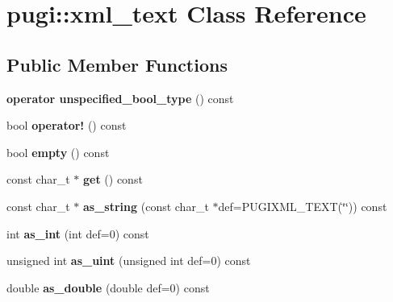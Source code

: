 \hypertarget{classpugi_1_1xml__text}{}\section{pugi\+:\+:xml\+\_\+text Class Reference}
\label{classpugi_1_1xml__text}
\subsection*{Public Member Functions}
\begin{DoxyCompactItemize}
\item 
\mbox{\label{classpugi_1_1xml__text_a86173c40769addc6341cfa20036cf3a3}} 
{\bfseries operator unspecified\+\_\+bool\+\_\+type} () const
\item 
\mbox{\label{classpugi_1_1xml__text_a150343a64b87a3588aa6536f99c163a3}} 
bool {\bfseries operator!} () const
\item 
\mbox{\label{classpugi_1_1xml__text_a85208781a283c74ee85ea614d840fad1}} 
bool {\bfseries empty} () const
\item 
\mbox{\label{classpugi_1_1xml__text_af0d58e0fcba861989b74083675b828c3}} 
const char\+\_\+t $\ast$ {\bfseries get} () const
\item 
\mbox{\label{classpugi_1_1xml__text_a0326a8addff72d18208b259f71e64af0}} 
const char\+\_\+t $\ast$ {\bfseries as\+\_\+string} (const char\+\_\+t $\ast$def=P\+U\+G\+I\+X\+M\+L\+\_\+\+T\+E\+XT(\char`\"{}\char`\"{})) const
\item 
\mbox{\label{classpugi_1_1xml__text_acfe56b5e40a9f740394243808e2a64a7}} 
int {\bfseries as\+\_\+int} (int def=0) const
\item 
\mbox{\label{classpugi_1_1xml__text_ad5e0545a59a02a2319bfd6b54ca460be}} 
unsigned int {\bfseries as\+\_\+uint} (unsigned int def=0) const
\item 
\mbox{\label{classpugi_1_1xml__text_a071d2480d3ecf2625a8445d138a120d8}} 
double {\bfseries as\+\_\+double} (double def=0) const

\end{DoxyCompactItemize}
